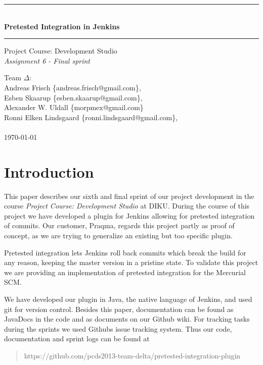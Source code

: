 \documentclass[a4paper,11pt]{article}
\makeatletter
\newcommand{\systemname}{Pretested Integration in Jenkins}
\newcommand{\groupname}{Team $\Delta$}
\newcommand{\groupmembers}{
	Andreas Frisch \{andreas.frisch@gmail.com\}, \\
	Esben Skaarup \{esben.skaarup@gmail.com\}, \\
	Alexander W. Uldall \{morpmex@gmail.com\} \\
	Ronni Elken Lindsgaard \{ronni.lindsgaard@gmail.com\}, \\
	~
}
\makeatother
\begin{document}
\begin{titlepage}
	\begin{center}
		\vspace*{4cm}
		\rule{\linewidth}{0.5mm}\\[0.4cm]
		{\huge \bfseries \systemname}
		\rule{\linewidth}{0.5mm}
	\end{center}
	\begin{flushleft}
		{
			\Large Project Course: Development Studio \\[0.1cm]
			{\it Assignment 6 - Final sprint}
		}
	\end{flushleft}
	\vspace*{4cm}
	
	\begin{flushleft}
		{\Large \groupname :} \\[0.1cm]
		{\Large \groupmembers} \\[0.3cm]
		{\Large \today}
	\end{flushleft}
\end{titlepage}
\newpage
\onehalfspacing
\setcounter{tocdepth}{2}

\tableofcontents
\newpage

\section{Introduction}
This paper describes our sixth and final sprint of our project development in
the course {\it Project
Course: Development Studio} at DIKU. During the course of this project we have
developed a plugin for Jenkins allowing for pretested integration of commits.
Our customer, Praqma, regards this project partly as proof of concept, as we are
trying to generalize an existing but too specific plugin.

Pretested integration lets Jenkins roll back commits which break the build for
any reason, keeping the master version in a pristine state. To validate this
project we are providing an implementation of pretested integration for the
Mercurial SCM.

We have developed our plugin in Java, the native language of Jenkins, and used
git for version control. Besides this paper, documentation can be found as
JavaDocs in the code and as documents on our Github wiki. For tracking tasks
during the sprints we used Githubs issue tracking system. Thus our code,
documentation and sprint logs can be found at
\begin{quote}
	https://github.com/pcds2013-team-delta/pretested-integration-plugin
\end{quote}
\end{document}
